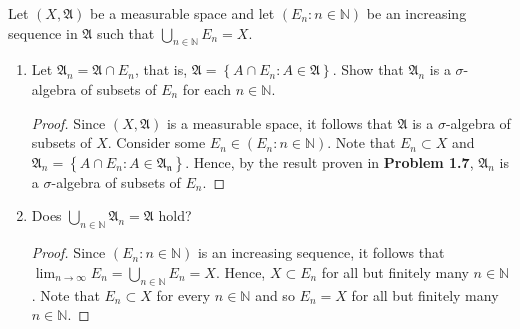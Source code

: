 \documentclass[12pt]{article}
\newcommand{\N}{\mathbb{N}}
\newenvironment{problem}[2][Problem]{\begin{trivlist}
		\item[\hskip \labelsep {\bfseries #1}\hskip \labelsep {\bfseries #2.}]}{\end{trivlist}}
\begin{document}
\begin{problem}{1.10}
	Let $\left(X,\mathfrak{A}\right)$ be a measurable space and let $\left(E_{n}:n\in \N\right)$ be an increasing sequence in $\mathfrak{A}$ such that $\bigcup_{n\in \N} E_{n} = X$.
	\begin{enumerate}[label=\textbf{(\alph*)}]
		\item Let $\mathfrak{A}_{n} = \mathfrak{A}\cap E_{n}$, that is, $\mathfrak{A} = \left\{A\cap E_{n}: A\in \mathfrak{A}\right\}$. Show that $\mathfrak{A}_{n}$ is a $\sigma$-algebra of subsets of $E_{n}$ for each $n\in \N$.
		\begin{proof}
	  	Since $(X,\mathfrak{A})$ is a measurable space, it follows that $\mathfrak{A}$ is a $\sigma$-algebra of subsets of $X$. Consider some $E_{n} \in \left(E_{n} : n\in \N\right)$. Note that $E_{n}\subset X$ and $\mathfrak{A}_{n} = \left\{A\cap E_{n}: A\in \mathfrak{A_{n}}\right\}$. Hence, by the result proven in \textbf{Problem 1.7}, $\mathfrak{A}_{n}$ is a $\sigma$-algebra of subsets of $E_{n}$.
		\end{proof}
		\item Does $\bigcup_{n\in \N} \mathfrak{A}_{n} = \mathfrak{A}$ hold?
		\begin{proof} 
			 Since $\left(E_{n}:n\in \N\right)$ is an increasing sequence, it follows that $\lim_{n \to \infty} E_{n} = \bigcup_{n\in \N} E_{n} = X$. Hence, $X\subset E_{n}$ for all but finitely many $n\in \N$. Note that $E_{n} \subset X$ for every $n\in \N$ and so $E_{n} = X$ for all but finitely many $n\in \N$. 
			 

\end{proof}
\end{enumerate}
\end{problem}
\end{document}
